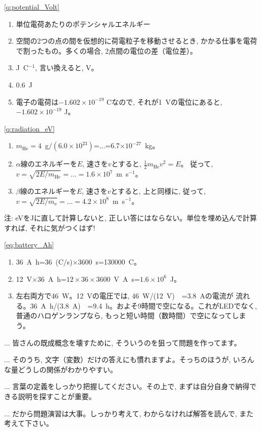 \ref{q:potential_Volt}　
\begin{enumerate}
\item 単位電荷あたりのポテンシャルエネルギー
\item 空間の2つの点の間を仮想的に荷電粒子を移動させるとき, 
かかる仕事を電荷で割ったもの。多くの場合, 2点間の電位の差（電位差）。
\item J~C$^{-1}$, 言い換えると, V。
\item 0.6~J
\item 電子の電荷は$-1.602\times10^{-19}$ Cなので, それが1~Vの電位にあると, 
$-1.602\times10^{-19}$ J。
\end{enumerate}
\mv


\ref{q:radiation_eV}
\begin{enumerate}
\item $m_{\text{He}}=4$~g$/(6.0\times10^{23})$=...=6.7$\times10^{-27}$~kg。
\item $\alpha$線のエネルギーを$E$, 速さを$v$とすると, $\frac{1}{2}m_{\text{He}}v^2=E$。
従って, $v=\sqrt{2E/m_{\text{He}}}=...=1.6\times10^7$~m~s$^{-1}$。
\item $\beta$線のエネルギーを$E$, 速さを$v$とすると, 上と同様に, 
従って, $v=\sqrt{2E/m_{\text{e}}}=...=4.2\times10^8$~m~s$^{-1}$。
\end{enumerate}
注: eVをJに直して計算しないと, 正しい答にはならない。単位を埋め込んで計算すれば, 
それに気がつくはず!
\mv


\ref{eq:battery_Ah}　
\begin{enumerate}
\item 36~A~h=36~(C/s)$\times$3600~s=130000~C。
\item 12~V$\times$36~A~h=$12\times36\times3600$~V~A~s=$1.6\times10^6$~J。
\item 左右両方で46~W。12~Vの電圧では, 46~W/(12~V)　=3.8~Aの電流が
流れる。36~A~h/(3.8~A)　=9.4~h。およそ9時間で空になる。これがLEDでなく, 
普通のハロゲンランプなら, もっと短い時間（数時間）で空になってしまう。
\end{enumerate}


\begin{faq}{\small{}
... 皆さんの既成概念を壊すために, そういうのを狙って問題を作ってます。}\end{faq}\mv

\begin{faq}{\small{}
 ... そのうち, 文字（変数）だけの答えにも慣れますよ。そっちのほうが, 
いろんな量どうしの関係がわかりやすい。}\end{faq}\mv

\begin{faq}{\small{}
 ... 言葉の定義をしっかり把握してください。その上で, まずは自分自身で納得できる説明を探すことが重要。}\end{faq}\mv

\begin{faq}{\small{}
... だから問題演習は大事。しっかり考えて, わからなければ解答を読んで, また考えて下さい。}\end{faq}\mv


